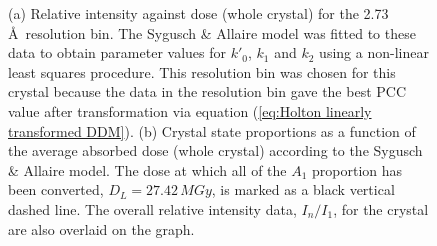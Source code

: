 \begin{figure}
\begin{subfigure}[b]{0.825\textwidth}
                \caption{}
                \label{figcrystalstates}
        \end{subfigure}
        \caption{(a) Relative intensity against dose (whole crystal) for the 2.73$\,$\AA\ resolution bin.
		The Sygusch \& Allaire model was fitted to these data to obtain parameter values for $k'_0$, $k_1$ and $k_2$ using a non-linear least squares procedure.
		This resolution bin was chosen for this crystal because the data in the resolution bin gave the best PCC value after transformation via equation (\ref{eq:Holton linearly transformed DDM}).
		(b) Crystal state proportions as a function of the average absorbed dose (whole crystal) according to the Sygusch \& Allaire model.
		The dose at which all of the $A_1$ proportion has been converted, $D_L = 27.42\,MGy$, is marked as a black vertical dashed line.
		The overall relative intensity data, $I_n/I_1$, for the crystal are also overlaid on the graph.}
        \label{figsyg}
\end{figure}
